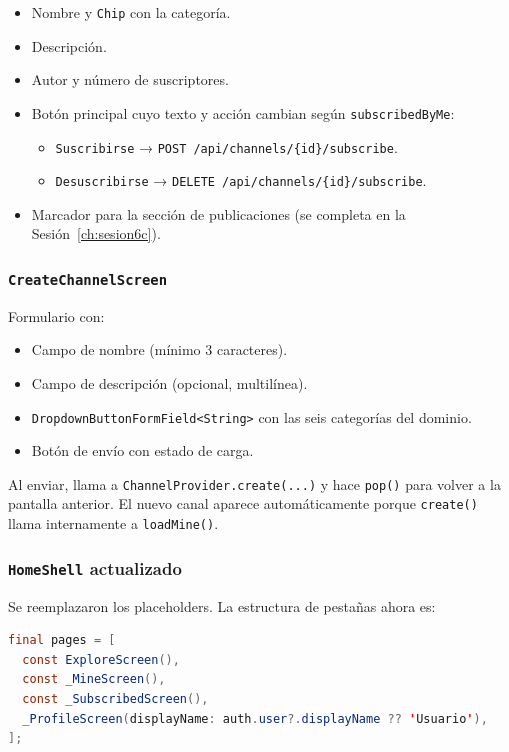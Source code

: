 \begin{itemize}[leftmargin=*]
  \item Nombre y \texttt{Chip} con la categoría.
  \item Descripción.
  \item Autor y número de suscriptores.
  \item Botón principal cuyo texto y acción cambian según \texttt{subscribedByMe}:
    \begin{itemize}
      \item \texttt{Suscribirse} → \texttt{POST /api/channels/\{id\}/subscribe}.
      \item \texttt{Desuscribirse} → \texttt{DELETE /api/channels/\{id\}/subscribe}.
    \end{itemize}
  \item Marcador para la sección de publicaciones (se completa en la Sesión~\ref{ch:sesion6c}).
\end{itemize}

\subsubsection{\texttt{CreateChannelScreen}}

Formulario con:

\begin{itemize}[leftmargin=*]
  \item Campo de nombre (mínimo 3 caracteres).
  \item Campo de descripción (opcional, multilínea).
  \item \texttt{DropdownButtonFormField<String>} con las seis categorías del dominio.
  \item Botón de envío con estado de carga.
\end{itemize}

Al enviar, llama a \texttt{ChannelProvider.create(...)} y hace \texttt{pop()} para volver a la pantalla anterior. El nuevo canal aparece automáticamente porque \texttt{create()} llama internamente a \texttt{loadMine()}.

\subsubsection{\texttt{HomeShell} actualizado}

Se reemplazaron los placeholders. La estructura de pestañas ahora es:

\begin{lstlisting}[language=Java]
final pages = [
  const ExploreScreen(),
  const _MineScreen(),
  const _SubscribedScreen(),
  _ProfileScreen(displayName: auth.user?.displayName ?? 'Usuario'),
];
\end{lstlisting}


